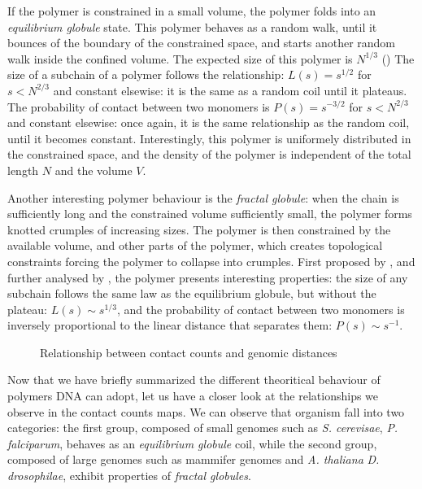 If the polymer is constrained in a small volume, the polymer folds into an
\textit{equilibrium globule} state. This polymer behaves as a random walk,
until it bounces of the boundary of the constrained space, and starts another
random walk inside the confined volume. The expected size of this polymer is
$N^{1/3}$ () The size of a subchain of a polymer follows the relationship: $L(s) =
s^{1/2}$ for $s < N^{2/3}$ and constant elsewise: it is the same as a random
coil until it plateaus. The probability of contact between two monomers is
$P(s) = s^{-3/2}$ for $s < N^{2/3}$ and constant elsewise: once again, it is
the same relationship as the random coil, until it becomes constant.
Interestingly, this polymer is uniformely distributed in the constrained
space, and the density of the polymer is independent of the total length $N$
and the volume $V$.

Another interesting polymer behaviour is the \textit{fractal globule}: when
the chain is sufficiently long and the constrained volume sufficiently small,
the polymer forms knotted crumples of increasing sizes. The polymer is then
constrained by the available volume, and other parts of the polymer, which
creates topological constraints forcing the polymer to collapse into crumples.
First proposed by \citet{grosberg:role}, and further analysed by
\citet{mirny:fractal}, the polymer presents interesting properties: the size
of any subchain follows the same law as the equilibrium globule, but without
the plateau: $L(s) \sim s^{1/3}$, and the probability of contact between two
monomers is inversely proportional to the linear distance that separates them:
$P(s) \sim s^{-1}$.


\begin{figure}
\caption{Relationship between contact counts and genomic distances}
\label{fig:hic_relationships}
\end{figure}

Now that we have briefly summarized the different theoritical behaviour of
polymers DNA can adopt, let us have a closer look at the relationships we
observe in the contact counts maps. We can observe that organism fall into two
categories: the first group, composed of small genomes such as \textit{S.
cerevisae}, \textit{P. falciparum}, behaves as an \textit{equilibrium globule}
coil, while the second group, composed of large genomes such as mammifer
genomes and \textit{A. thaliana} \textit{D. drosophilae}, exhibit properties
of \textit{fractal globules}.

